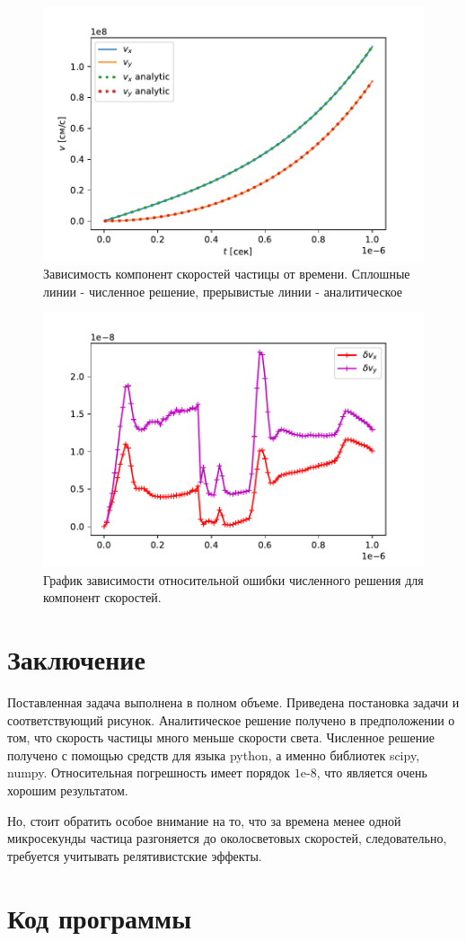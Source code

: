 \documentclass[a4paper]{article}
\begin{document}
\begin{figure}
	\centering
	\includegraphics[width=0.8\linewidth]{plotSpeed.pdf}
	\caption{Зависимость компонент скоростей частицы от времени. Сплошные линии - численное решение, прерывистые линии - аналитическое}
	\label{graph_s}
\end{figure}

\begin{figure}
	\centering
	\includegraphics[width=0.8\linewidth]{plotMistake.pdf}
	\caption{График зависимости относительной ошибки численного решения для компонент скоростей.}
	\label{graph_m}
\end{figure}

\section{Заключение}
Поставленная задача выполнена в полном объеме. Приведена постановка задачи и соответствующий рисунок. Аналитическое решение получено в предположении о том, что скорость частицы много меньше скорости света. Численное решение получено с помощью средств для языка python,  а именно библиотек scipy, numpy. Относительная погрешность имеет порядок  $1\text{e-}8$, что является очень хорошим результатом. 

Но, стоит обратить особое внимание на то, что за времена менее одной микросекунды частица разгоняется до околосветовых скоростей, следовательно, требуется учитывать релятивистские эффекты.

\clearpage
\section{Код программы}\label{code}
\singlespace

\end{document}
